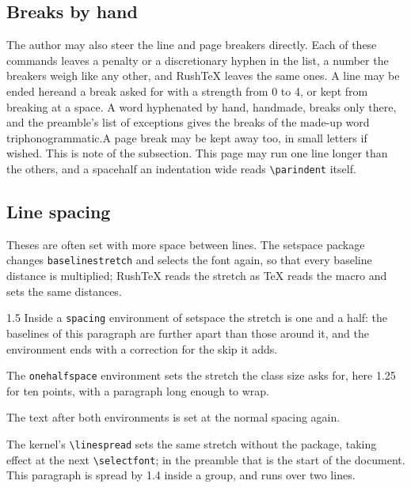 \documentclass{article}
\numberwithin{equation}{section}
\theoremstyle{definition}
\theoremstyle{remark}
\newcounter{rtcue}[subsection]
\begin{document}
\subsection{Breaks by hand}\label{sec:breaks}
The author may also steer the line and page breakers directly. Each of these commands
leaves a penalty or a discretionary hyphen in the list, a number the breakers weigh like
any other, and RushTeX leaves the same ones.
A line may be ended here\newline and a break asked for \linebreak[1] with a strength from
0 to 4, or kept from breaking \nolinebreak[2] at a space. A word hyphenated by hand,
hand\-made, breaks only there, and the preamble's list of exceptions gives the breaks of
the made-up word triphonogrammatic.\nopagebreak[3] A page break may be kept away
\nopagebreak{} too, \MakeLowercase{IN SMALL LETTERS} if wished. This is note
 of the subsection.
\raggedbottom
This page may run one line longer\enlargethispage{\baselineskip} than the others, and a
space\hspace{0.5\parindent}half an indentation wide reads \verb|\parindent| itself.

\subsection{Line spacing}\label{sec:spacing-lines}
Theses are often set with more space between lines. The setspace package changes
\texttt{baselinestretch} and selects the font again, so that every baseline distance is
multiplied; RushTeX reads the stretch as \TeX{} reads the macro and sets the same
distances.

\begin{spacing}{1.5}
Inside a \texttt{spacing} environment of setspace the stretch is one and a half: the
baselines of this paragraph are further apart than those around it, and the environment
ends with a correction for the skip it adds.
\end{spacing}
\begin{onehalfspace}
The \texttt{onehalfspace} environment sets the stretch the class size asks for, here
1.25 for ten points, with a paragraph long enough to wrap.
\end{onehalfspace}
The text after both environments is set at the normal spacing again.

{\linespread{1.4}\selectfont The kernel's \verb|\linespread| sets the same stretch
without the package, taking effect at the next \verb|\selectfont|; in the preamble that is
the start of the document. This paragraph is spread by 1.4 inside a group, and runs over
two lines.\par}
\end{document}
